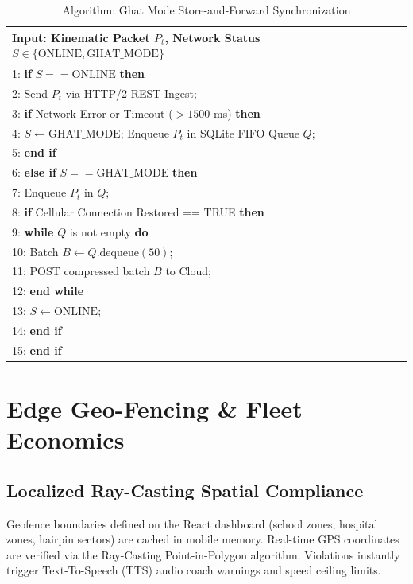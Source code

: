 \documentclass[conference]{IEEEtran}
\begin{document}
\begin{table}[htbp]
\caption{Algorithm: Ghat Mode Store-and-Forward Synchronization}
\label{tab:alg}
\centering
\begin{tabular}{p{}}
\toprule
\textbf{Input:} Kinematic Packet $P_t$, Network Status $S \in \{\text{ONLINE}, \text{GHAT\_MODE}\}$ \\
\midrule
1: \textbf{if} $S == \text{ONLINE}$ \textbf{then} \\
2: \quad Send $P_t$ via HTTP/2 REST Ingest; \\
3: \quad \textbf{if} Network Error or Timeout ($>1500$ ms) \textbf{then} \\
4: \qquad $S \leftarrow \text{GHAT\_MODE}$; Enqueue $P_t$ in SQLite FIFO Queue $Q$; \\
5: \quad \textbf{end if} \\
6: \textbf{else if} $S == \text{GHAT\_MODE}$ \textbf{then} \\
7: \quad Enqueue $P_t$ in $Q$; \\
8: \quad \textbf{if} Cellular Connection Restored == TRUE \textbf{then} \\
9: \qquad \textbf{while} $Q$ is not empty \textbf{do} \\
10: \qquad\quad Batch $B \leftarrow Q.\text{dequeue}(50)$; \\
11: \qquad\quad POST compressed batch $B$ to Cloud; \\
12: \qquad \textbf{end while} \\
13: \qquad $S \leftarrow \text{ONLINE}$; \\
14: \quad \textbf{end if} \\
15: \textbf{end if} \\
\bottomrule
\end{tabular}
\end{table}

\section{Edge Geo-Fencing \& Fleet Economics}
\subsection{Localized Ray-Casting Spatial Compliance}
Geofence boundaries defined on the React dashboard (school zones, hospital zones, hairpin sectors) are cached in mobile memory. Real-time GPS coordinates are verified via the Ray-Casting Point-in-Polygon algorithm. Violations instantly trigger Text-To-Speech (TTS) audio coach warnings and speed ceiling limits.
\end{document}
